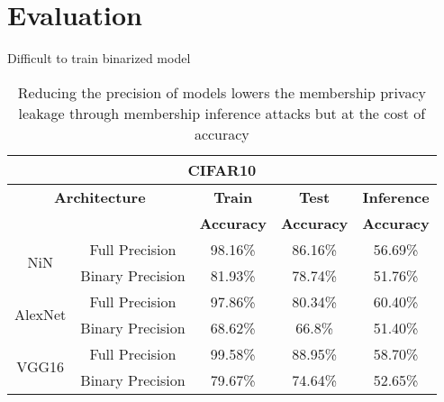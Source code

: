 \section{Evaluation}\label{evaluation}

Difficult to train binarized model~\cite{AAAI1714619}

\begin{table}[!htb]
\begin{center}
\renewcommand\arraystretch{1.5}
\fontsize{6.7pt}{6.7pt}\selectfont
\begin{tabular}{|c|c|c|c|c|}
\hline
\multicolumn{5}{|c|}{\textbf{CIFAR10}} \\
\hline
\multicolumn{2}{|c|}{\textbf{Architecture}} & \textbf{Train}  & \textbf{Test}  & \textbf{Inference}  \\
 \multicolumn{2}{|c|}{} & \textbf{Accuracy} & \textbf{Accuracy} & \textbf{Accuracy}  \\
\hline
\multirow{2}{*}{NiN} & Full Precision & 98.16\% & 86.16\% & \cellcolor{red!25}56.69\% \\
& Binary Precision & 81.93\% & 78.74\% & \cellcolor{green!25}51.76\% \\
\hline
\multirow{2}{*}{AlexNet} & Full Precision & 97.86\% & 80.34\% & \cellcolor{red!25}60.40\% \\
& Binary Precision & 68.62\% & 66.8\% & \cellcolor{green!25}51.40\% \\
\hline
\multirow{2}{*}{VGG16} & Full Precision & 99.58\% & 88.95\% & \cellcolor{red!25}58.70\%\\
& Binary Precision & 79.67\% & 74.64\% & \cellcolor{green!25}52.65\%\\
\hline
\end{tabular}
\end{center}
\caption{Reducing the precision of models lowers the membership privacy leakage through membership inference attacks but at the cost of accuracy}
\label{fmnist_quantize}
\end{table}





